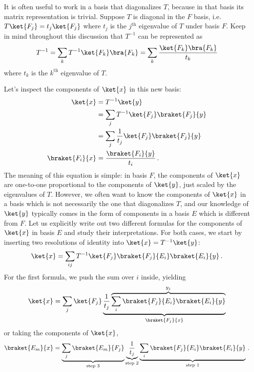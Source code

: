 
It is often useful to work in a basis that diagonalizes $T$, because in that basis its matrix representation is trivial.
Suppose $T$ is diagonal in the $F$ basis, i.e. $T\ket{F_j} = t_j \ket{F_j}$ where $t_j$ is the $j^\text{th}$ eigenvalue of $T$ under basis $F$.
Keep in mind throughout this discussion that $T^{-1}$ can be represented as
\begin{equation}
  T^{-1} = \sum_k T^{-1} \ket{F_k}\bra{F_k} = \sum_k \frac{\ket{F_k}\bra{F_k}}{t_k}
\end{equation}
where $t_k$ is the $k^\text{th}$ eigenvalue of $T$.

Let's inspect the components of $\ket{x}$ in this new basis:
\begin{align}
  \ket{x} &= T^{-1} \ket{y} \nonumber \\
  &= \sum_j T^{-1} \ket{F_j}\braket{F_j}{y} \nonumber \\
  &= \sum_j \frac{1}{t_j} \ket{F_j}\braket{F_j}{y} \nonumber \\
  \braket{F_i}{x} &= \frac{\braket{F_i}{y}}{t_i}
  \, .
\end{align}
The meaning of this equation is simple: in basis $F$, the components of $\ket{x}$ are one-to-one proportional to the components of $\ket{y}$, just scaled by the eigenvalues of $T$.
However, we often want to know the components of $\ket{x}$ in a basis which is not necessarily the one that diagonalizes $T$, and our knowledge of $\ket{y}$ typically comes in the form of components in a basis $E$ which is different from $F$.
Let us explicitly write out two different formulas for the components of $\ket{x}$ in basis $E$ and study their interpretations.
For both cases, we start by inserting two resolutions of identity into $\ket{x} = T^{-1} \ket{y}$:
\begin{equation}
  \ket{x} = \sum_{ij} T^{-1} \ket{F_j} \braket{F_j}{E_i}\braket{E_i}{y}
  \, .
  \label{eq:master}
\end{equation}
For the first formula, we push the sum over $i$ inside, yielding
\begin{equation}
  \ket{x} = \sum_j \ket{F_j} \underbrace{\frac{1}{t_j} \overbrace{\sum_i \braket{F_j}{E_i} \braket{E_i}{y}}^{y_j}}_{\braket{F_j}{x}}
\end{equation}
or taking the components of $\ket{x}$,
\begin{equation}
  \braket{E_m}{x}
  =
    \underbrace{\sum_j \braket{E_m}{F_j}}_\text{step 3}
    \underbrace{\frac{1}{t_j}}_\text{step 2}
    \underbrace{\sum_i \braket{F_j}{E_i} \braket{E_i}{y}}_\text{step 1}
  \, . \label{eq:three_step_process_a}
\end{equation}
